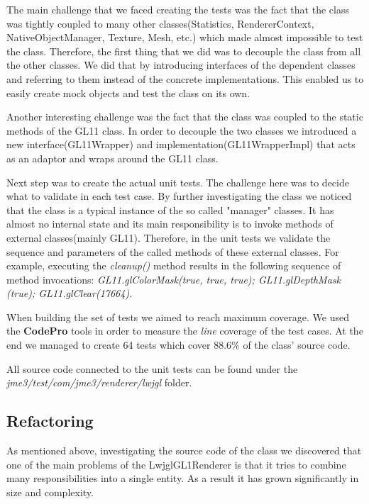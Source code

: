 \documentclass[a4paper, notitlepage]{article}
\begin{document}
The main challenge that we faced creating the tests was the fact that the class was tightly coupled to many other classes(Statistics, RendererContext, NativeObjectManager, Texture, Mesh, etc.) which made almost impossible to test the class. Therefore, the first thing that we did was to decouple the class from all the other classes. We did that by introducing interfaces of the dependent classes and referring to them instead of the concrete implementations. This enabled us to easily create mock objects and test the class on its own. 

Another interesting challenge was the fact that the class was coupled to the static methods of the GL11 class. In order to decouple the two classes we introduced a new interface(GL11Wrapper) and implementation(GL11WrapperImpl) that acts as an adaptor and wraps around the GL11 class. 

Next step was to create the actual unit tests. The challenge here was to decide what to validate in each test case. By further investigating the class we noticed that the class is a typical instance of the so called "manager" classes. It has almost no internal state and its main responsibility is to invoke methods of external classes(mainly GL11). Therefore, in the unit tests we validate the sequence and parameters of the called methods of these external classes. For example, executing the \textit{cleanup()} method results in the following sequence of method invocations: \textit{GL11.glColorMask(true, true, true); GL11.glDepthMask (true); GL11.glClear(17664)}.

When building the set of tests we aimed to reach maximum coverage. We used the \textbf{CodePro} tools in order to measure  the \textit{line} coverage of the test cases. At the end we managed to create 64 tests which cover 88.6\% of the class' source code.

All source code connected to the unit tests can be found under the \textit{jme3/test/com/jme3/renderer/lwjgl} folder.


\subsection{Refactoring}

As mentioned above, investigating the source code of the class we discovered that one of the main problems of the LwjglGL1Renderer is that it tries to combine many responsibilities into a single entity. As a result it has grown significantly in size and complexity. 
\end{document}
